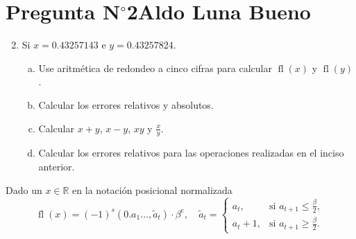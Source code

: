 \section{Pregunta N$^{\circ}$2\qquad Aldo Luna Bueno}

\begin{frame}

	\begin{enumerate}\setcounter{enumi}{1}
		\item

		      Si $x=0.43257143$ e $y=0.43257824$.

		      \begin{enumerate}[a)]
			      \item\label{q:2.a}

			      Use aritmética de redondeo a cinco cifras para calcular
			      \begin{math}
				      \operatorname{fl}\left(x\right)
			      \end{math}
			      y
			      \begin{math}
				      \operatorname{fl}\left(y\right)
			      \end{math}.

			      \item\label{q:2.b}

			      Calcular los errores relativos y absolutos.

			      \item\label{q:2.c}

			      Calcular $x+y$, $x-y$, $xy$ y $\frac{x}{y}$.

			      \item\label{q:2.d}

			      Calcular los errores relativos para las operaciones
			      realizadas en el inciso anterior.
		      \end{enumerate}
	\end{enumerate}

	\begin{solution}
		\begin{definition}[Redondeo]
			Dado un $x\in\mathbb{R}$ en la notación posicional normalizada
			\begin{equation*}
				\operatorname{fl}\left(x\right)=
				{\left(-1\right)}^{s}
				\left(
				0.a_{1}\dotsc,\widetilde{a}_{t}
				\right)\cdot
				\beta^{e},\quad
				\widetilde{a}_{t}=
				\begin{cases}
					a_{t},   & \text{si } a_{t+1}\leq\frac{\beta}{2}, \\
					a_{t}+1, & \text{si } a_{t+1}\geq\frac{\beta}{2}.
				\end{cases}
			\end{equation*}
		\end{definition}
	\end{solution}
\end{frame}

